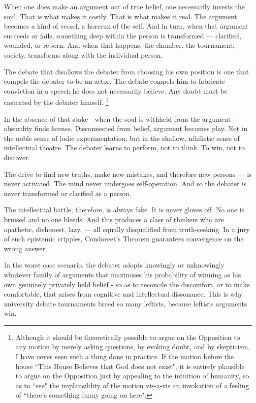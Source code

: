 \begin{itemize}
When one does make an argument out of true belief, one necessarily invests the soul. That is what makes it costly. That is what makes it real. The argument becomes a kind of vessel, a horcrux of the self. And in turn, when that argument succeeds or fails, something deep within the person is transformed — clarified, wounded, or reborn. And when that happens, the chamber, the tournament, society, transforms along with the individual person.

The debate that disallows the debater from choosing his own position is one that compels the debater to be an actor. The debate compels him to fabricate conviction in a speech he does not necessarily believe. Any doubt must be castrated by the debater himself. \footnote{Although it should be theoretically possible to argue on the Opposition to any motion by merely asking questions, by evoking doubt, and by skepticism, I have never seen such a thing done in practice. If the motion before the house “This House Believes that God does not exist", it is entirely plausible to argue on the Opposition just by appealing to the intuition of humanity, so as to “see" the implausiblity of the motion vis-a-vis an invokation of a feeling of “there's something funny going on here".}

In the absence of that stake - when the soul is withheld from the argument — absurdity finds license. Disconnected from belief, argument becomes play. Not in the noble sense of ludic experimentation, but in the shallow, nihilistic sense of intellectual theatre. The debater learns to perform, not to think. To win, not to discover.

The drive to find new truths, make new mistakes, and therefore new persons — is never activated. The mind never undergoes self-operation. And so the debater is never transformed or clarified as a person.

The intellectual battle, therefore, is always fake. It is never gloves off. No one is bruised and no one bleeds. And this produces a class of thinkers who are apathetic, dishonest, lazy, — all equally disqualified from truth-seeking. In a jury of such epistemic cripples, Condorcet’s Theorem guarantees convergence on the wrong answer. 

In the worst case scenario, the debater adopts knowingly or unknowingly whatever family of arguments that maximises his probability of winning as his own genuinely privately held belief - so as to reconcile the discomfort, or to make comfortable, that arises from cognitive and intellectual dissonance. This is why university debate tournaments breed so many leftists, because leftists arguments win. 


\end{itemize}
